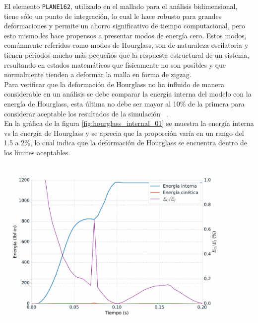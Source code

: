 El elemento \texttt{PLANE162}, utilizado en el mallado para el análisis bidimensional, 
tiene sólo un punto de integración, lo cual le hace robusto para grandes deformaciones 
y permite un ahorro significativo de tiempo computacional, pero esto mismo les hace 
propensos a presentar modos de energía cero. Estos modos, comúnmente referidos como 
modos de Hourglass, son de naturaleza oscilatoria y tienen periodos mucho más pequeños 
que la respuesta estructural de un sistema, resultando en estados matemáticos que físicamente 
no son posibles y que normalmente tienden a deformar la malla en forma de zigzag.\\


Para verificar que la deformación de Hourglass no ha influido de manera considerable 
en un análisis se debe comparar la energía interna del modelo con la energía de Hourglass, 
esta última no debe ser mayor al 10\% de la primera para considerar aceptable los 
resultados de la simulación ~\cite{lsdyna-ansys-manual}. \\

En la gráfica de la figura \ref{fig:hourglass_internal_01} 
se muestra la energía interna vs la energía de Hourglass y se aprecia que la proporción 
varía en un rango del 1.5 a 2\%, lo cual indica que la deformación de Hourglass se encuentra 
dentro de los límites aceptables.

\begin{center}
\includegraphics[width=0.88\textwidth]{src/ch4/energy_status_01.pdf}
\label{fig:energy_status_01}
\end{center}

